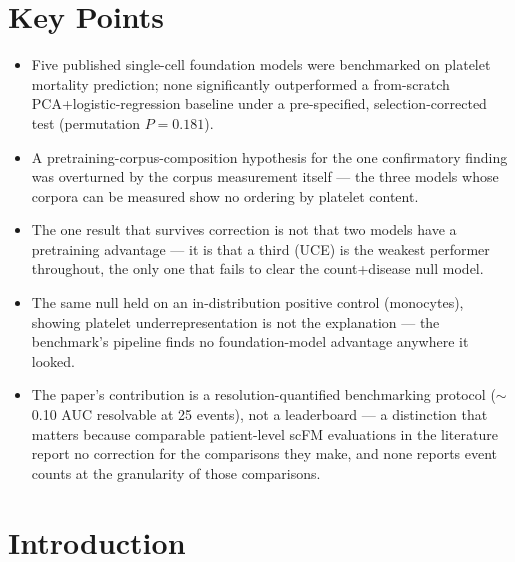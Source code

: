 \documentclass[11pt,a4paper]{article}
\newcommand{\model}[1]{\textsc{#1}}
\begin{document}
\section*{Key Points}
\begin{itemize}
    \item Five published single-cell foundation models were benchmarked on
    platelet mortality prediction; none significantly outperformed a
    from-scratch PCA+logistic-regression baseline under a pre-specified,
    selection-corrected test (permutation $P = 0.181$).
    \item A pretraining-corpus-composition hypothesis for the one confirmatory
    finding was overturned by the corpus measurement itself --- the three
    models whose corpora can be measured show no ordering by platelet content.
    \item The one result that survives correction is not that two models have
    a pretraining advantage --- it is that a third (\model{UCE}) is the
    weakest performer throughout, the only one that fails to clear the
    count+disease null model.
    \item The same null held on an in-distribution positive control
    (monocytes), showing platelet underrepresentation is not the explanation
    --- the benchmark's pipeline finds no foundation-model advantage anywhere
    it looked.
    \item The paper's contribution is a resolution-quantified benchmarking
    protocol ($\sim$0.10 AUC resolvable at 25 events), not a leaderboard ---
    a distinction that matters because comparable patient-level scFM
    evaluations in the literature report no correction for the comparisons
    they make, and none reports event counts at the granularity of those
    comparisons.
\end{itemize}

\newpage

\section{Introduction}
\end{document}
